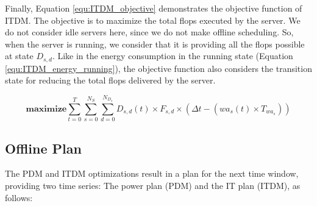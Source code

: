 Finally, Equation \ref{equ:ITDM_objective} demonstrates the objective function of ITDM. The objective is to maximize the total flops executed by the server. We do not consider idle servers here, since we do not make offline scheduling. So, when the server is running, we consider that it is providing all the flops possible at state $D_{s,d}$. Like in the energy consumption in the running state (Equation \ref{equ:ITDM_energy_running}), the objective function also considers the transition state for reducing the total flops delivered by the server.

\begin{equation}
    \label{equ:ITDM_objective}
    \mathbf{maximize} \sum_{t=0}^{T}\sum_{s=0}^{N_{S}}\sum_{d=0}^{N_{D_{s}}} D_{s,d}(t) \times F_{s,d} \times (\Delta t - (wa_{s}(t) \times T_{wa_{s}}))
\end{equation}



\subsection{Offline Plan}
\label{sec:offline_plan}

The PDM and ITDM optimizations result in a plan for the next time window, providing two time series: The power plan (PDM) and the IT plan (ITDM), as follows:


